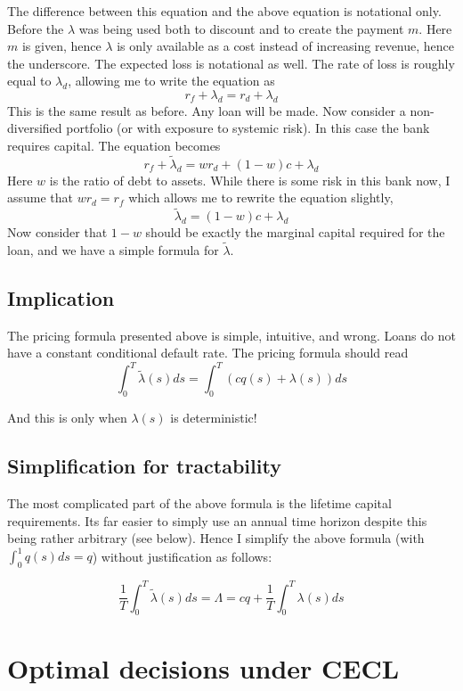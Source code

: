 \documentclass{article}
\begin{document}
The difference between this equation and the above equation is notational only.  Before the \(\lambda\) was being used both to discount and to create the payment \(m\).  Here \(m\) is given, hence \(\lambda\) is only available as a cost instead of increasing revenue, hence the underscore.  The expected loss is notational as well.  The rate of loss is roughly equal to \(\lambda_d\), allowing me to write the equation as 
\[r_f+\lambda_d=r_d+\lambda_d\]
This is the same result as before.  Any loan will be made.  Now consider a non-diversified portfolio (or with exposure to systemic risk). In this case the bank requires capital. The equation becomes 
\[r_f+\tilde{\lambda}_d=w r_d +(1-w) c+\lambda_d\]
Here \(w\) is the ratio of debt to assets.  While there is some risk in this bank now, I assume that \(w r_d=r_f\) which allows me to rewrite the equation slightly, 
\[\tilde{\lambda}_d=(1-w)c+\lambda_d\]
Now consider that \(1-w\) should be exactly the marginal capital required for the loan, and we have a simple formula for \(\tilde{\lambda}\).  

\subsection{Implication}

The pricing formula presented above is simple, intuitive, and wrong.  Loans do not have a constant conditional default rate.  The pricing formula should read \[\int_0^T\tilde{\lambda}(s) ds = \int_0^T \left(c q(s) +\lambda(s)\right)ds\]

And this is only when \(\lambda(s)\) is deterministic!  

\subsection{Simplification for tractability}

The most complicated part of the above formula is the lifetime capital requirements.  Its far easier to simply use an annual time horizon despite this being rather arbitrary (see below).  Hence I simplify the above formula (with \(\int_0 ^ 1 q(s)ds=q\)) without justification as follows:

\[\frac{1}{T} \int_0^T\tilde{\lambda}(s) ds=\Lambda = c q+\frac{1}{T}\int_0^T\lambda(s)ds\]




\section{Optimal decisions under CECL}
\end{document}
